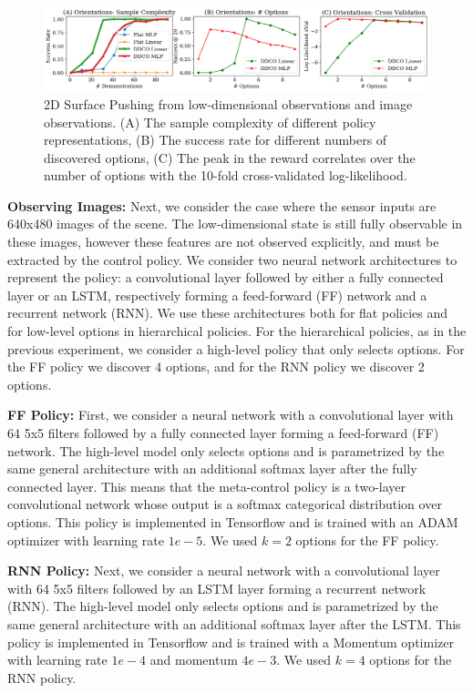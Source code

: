 \begin{figure}[ht!]
    \centering
    \includegraphics[width=\textwidth]{ddco-experiments/exp1-1.png}
    \caption{2D Surface Pushing from low-dimensional observations and image observations. (A) The sample complexity of different policy representations, (B) The success rate for different numbers of discovered options, (C) The peak in the reward correlates over the number of options with the 10-fold cross-validated log-likelihood. \label{fig:b2dexp1-1}}
\end{figure}

\vspace{0.25em}\noindent\textbf{Observing Images: } Next, we consider the case where the sensor inputs are 640x480 images of the scene. The low-dimensional state is still fully observable in these images, however these features are not observed explicitly, and must be extracted by the control policy. We consider two neural network architectures to represent the policy: a convolutional layer followed by either a fully connected layer or an LSTM, respectively forming a feed-forward (FF) network and a recurrent network (RNN).
We use these architectures both for flat policies and for low-level options in hierarchical policies.
For the hierarchical policies, as in the previous experiment, we consider a high-level policy that only selects options.
For the FF policy we discover 4 options, and for the RNN policy we discover 2 options.
 
 \vspace{0.25em}\noindent \textbf{\alg FF Policy: } First, we consider a neural network with a convolutional layer with 64 5x5 filters followed by a fully connected layer forming a feed-forward (FF) network. The high-level model only selects options and is parametrized by the same general architecture with an additional softmax layer after the fully connected layer. This means that the meta-control policy is a two-layer convolutional network whose output is a softmax categorical distribution over options. This policy is implemented in Tensorflow and is trained with an ADAM optimizer with learning rate $1e-5$.
 We used $k=2$ options for the FF policy.
 
 \vspace{0.25em}\noindent \textbf{\alg RNN Policy: } Next, we consider a neural network with a convolutional layer with 64 5x5 filters followed by an LSTM layer forming  a recurrent network (RNN). The high-level model only selects options and is parametrized by the same general architecture with an additional softmax layer after the LSTM. This policy is implemented in Tensorflow and is trained with a Momentum optimizer with learning rate $1e-4$ and momentum $4e-3$.
  We used $k=4$ options for the RNN policy.

